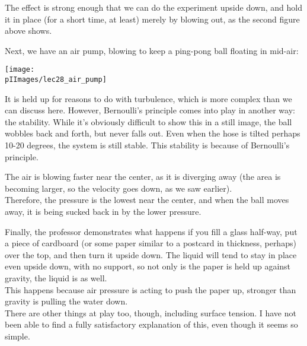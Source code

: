 The effect is strong enough that we can do the experiment upside down, and hold it in place (for a short time, at least) merely by blowing out, as the second figure above shows.

Next, we have an air pump, blowing to keep a ping-pong ball floating in mid-air:

\begin{center}
\texttt{[image: \\pIImages/lec28\_air\_pump]}
\end{center}

It is held up for reasons to do with turbulence, which is more complex than we can discuss here. However, Bernoulli's principle comes into play in another way: the stability. While it's obviously difficult to show this in a still image, the ball wobbles back and forth, but never falls out. Even when the hose is tilted perhaps 10-20 degrees, the system is still stable. This stability is because of Bernoulli's principle.

\begin{figure}[H]
\centering
{}%
\end{figure}


The air is blowing faster near the center, as it is diverging away (the area is becoming larger, so the velocity goes down, as we saw earlier).\\
Therefore, the pressure is the lowest near the center, and when the ball moves away, it is being sucked back in by the lower pressure.

Finally, the professor demonstrates what happens if you fill a glass half-way, put a piece of cardboard (or some paper similar to a postcard in thickness, perhaps) over the top, and then turn it upside down. The liquid will tend to stay in place even upside down, with no support, so not only is the paper is held up against gravity, the liquid is as well.\\
This happens because air pressure is acting to push the paper up, stronger than gravity is pulling the water down.\\
There are other things at play too, though, including surface tension. I have not been able to find a fully satisfactory explanation of this, even though it seems so simple.

